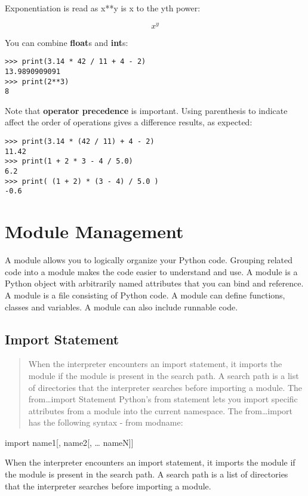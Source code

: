 Exponentiation is read as x**y is x to the yth power:

\[x^y\]

You can combine \textbf{float}s and \textbf{int}s:

\begin{verbatim}
>>> print(3.14 * 42 / 11 + 4 - 2)
13.9890909091
>>> print(2**3)
8
\end{verbatim}

Note that \textbf{operator precedence} is important. Using parenthesis
to indicate affect the order of operations gives a difference results,
as expected:

\begin{verbatim}
>>> print(3.14 * (42 / 11) + 4 - 2)
11.42
>>> print(1 + 2 * 3 - 4 / 5.0)
6.2
>>> print( (1 + 2) * (3 - 4) / 5.0 )
-0.6
\end{verbatim}



\section{Module Management}\label{module-management}

A module allows you to logically organize your Python code. Grouping
related code into a module makes the code easier to understand and use.
A module is a Python object with arbitrarily named attributes that you
can bind and reference. A module is a file consisting of Python code. A
module can define functions, classes and variables. A module can also
include runnable code.

\subsection{Import Statement}\label{import-statement}

\begin{quote}
When the interpreter encounters an import statement, it imports the
module if the module is present in the search path. A search path is a
list of directories that the interpreter searches before importing a
module. The from\ldots{}import Statement Python's from statement lets
you import specific attributes from a module into the current namespace.
The from\ldots{}import has the following syntax - from modname:
\end{quote}

import name1{[}, name2{[}, \ldots{} nameN{]}{]}

When the interpreter encounters an import statement, it imports the
module if the module is present in the search path. A search path is a
list of directories that the interpreter searches before importing a
module.

